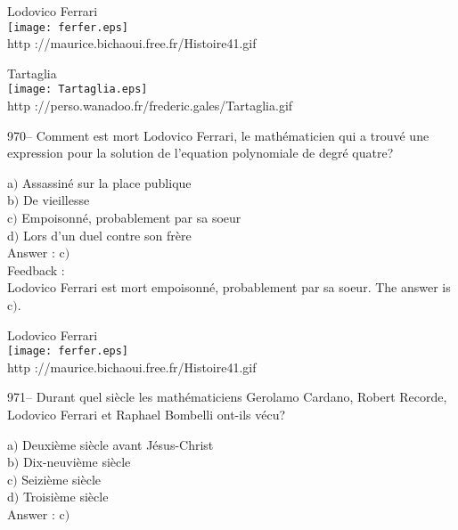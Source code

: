 \documentclass[letterpaper, 12pt]{article}
\begin{document}
        \begin{center}
        Lodovico Ferrari\\
    \texttt{[image: ferfer.eps]}\\
        {\footnotesize http ://maurice.bichaoui.free.fr/Histoire41.gif}
    \end{center}

        \begin{center}
        Tartaglia\\
    \texttt{[image: Tartaglia.eps]}\\
        {\footnotesize http
://perso.wanadoo.fr/frederic.gales/Tartaglia.gif}
    \end{center}

970-- Comment est mort Lodovico Ferrari, le math\'ematicien qui a
trouv\'e une expression pour la solution de l'equation polynomiale
de degr\'e quatre?

a$)$ Assassin\'e sur la place publique \\
b$)$ De vieillesse  \\
c$)$ Empoisonn\'e, probablement par sa soeur \\
d$)$ Lors d'un duel contre son fr\`ere \\

Answer : c$)$\\

Feedback : \\
Lodovico Ferrari est mort empoisonn\'e, probablement par sa soeur.
The answer is c$)$.

        \begin{center}
        Lodovico Ferrari\\
    \texttt{[image: ferfer.eps]}\\
        {\footnotesize http ://maurice.bichaoui.free.fr/Histoire41.gif}
    \end{center}

971-- Durant quel si\`ecle les math\'ematiciens Gerolamo Cardano,
Robert Recorde, Lodovico Ferrari et Raphael Bombelli ont-ils v\'ecu?

a$)$ Deuxi\`eme si\`ecle avant J\'esus-Christ \\
b$)$ Dix-neuvi\`eme si\`ecle \\
c$)$ Seizi\`eme si\`ecle  \\
d$)$ Troisi\`eme si\`ecle \\

Answer : c$)$\\
\end{document}
